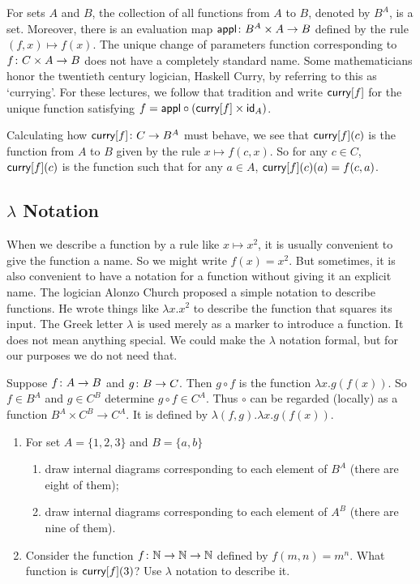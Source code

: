 \begin{principle}
	For sets $A$ and $B$, the collection of all functions from $A$ to $B$, denoted by $B^A$, is a set.
	Moreover, there is an evaluation map ${\mathord{\textsf{appl}}}\colon{B^A\times A}\to{B}$ defined by the rule $(f,x) \mapsto f(x)$.
	The unique change of parameters function corresponding to ${f}\colon{C\times A}\to{B}$ does not have a completely standard name.
	Some mathematicians honor the twentieth century logician, Haskell Curry, by referring to this as `currying'.
	For these lectures, we follow that tradition and write $\mathord{\textsf{curry}}[f]$ for the unique function satisfying $f = \mathord{\textsf{appl}}\circ (\mathord{\textsf{curry}}[f] \times \textsf{id}_A)$.
	
	Calculating how ${\mathord{\textsf{curry}}[f]}\colon{C}\to{B^A}$ must behave, we see that $\mathord{\textsf{curry}}[f](c)$ is the function from $A$ to $B$ given by the rule $x\mapsto f(c,x)$.
	So for any $c\in C$, $\mathord{\textsf{curry}}[f](c)$ is the function such that for any $a\in A$, $\mathord{\textsf{curry}}[f](c)(a) = f(c,a)$. 
\end{principle}

\subsection*{$\lambda$ Notation}

When we describe a function by a rule like $x\mapsto x^2$, it is usually convenient to give the function a name.
So we might write $f(x) = x^2$.
But sometimes, it is also convenient to have a notation for a function without giving it an explicit name. 
The logician Alonzo Church \cite{church} proposed a simple notation to describe functions. 
He wrote things like $\lambda x.x^2$ to describe the function that squares its input. 
The Greek letter $\lambda$ is used merely as a marker to introduce a function. 
It does not mean anything special. 
We could make the $\lambda$ notation formal, but for our purposes we do not need that.

\begin{example}
	Suppose ${f}\colon{A}\to{B}$ and ${g}\colon{B}\to{C}$. Then $g\circ f$ is the function
	$\lambda x.g(f(x))$.  So $f\in B^A$ and $g\in C^B$ determine $g\circ f\in C^A$.
	Thus $\circ$ can be regarded (locally) as a function $B^A\times C^B\to C^A$.
	It is defined by $\lambda(f,g).\lambda x.g(f(x))$.
\end{example}
 

\begin{exercises}
	\begin{enumerate}
		\item  For set $A= \{1,2,3\}$ and $B = \{a,b\}$ 
			\begin{enumerate}
				\item draw internal diagrams corresponding to each element of $B^A$ (there are eight of them);
				\item draw internal diagrams corresponding to each element of $A^B$ (there are nine of them).
			\end{enumerate}
		\item Consider the function ${f}\colon{\mathbb N\to\mathbb N}\to{\mathbb N}$ defined by
		      $f(m,n) = m^n$. What function is $\mathord{\textsf{curry}}[f](3)$? Use $\lambda$ notation to describe it.
	\end{enumerate}	
\end{exercises}

